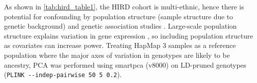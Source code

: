 As shown in \autoref{tab:hird_table1}, the \gls{HIRD} cohort is multi-ethnic, hence there is potential for confounding by population structure (sample structure due to genetic background) and genetic association studies \autocite{price2006PrincipalComponentsAnalysis,eu-ahsunthornwattana2014ComparisonMethodsAccount}.
Large-scale population structure explains variation in gene expression \autocite{brown2018ExpressionReflectsPopulation}, so including population structure as covariates can increase power.
Treating HapMap 3 samples \autocite{theinternationalhapmap3consortium2010IntegratingCommonRare} as a reference population where the major axes of variation in genotypes are likely to be ancestry, \gls{PCA} was performed using smartpca (v8000) on \gls{LD}-pruned genotypes (\texttt{PLINK -{}-indep-pairwise 50 5 0.2}).
